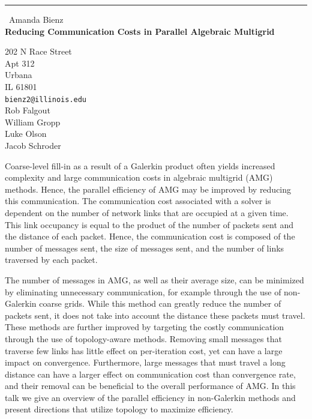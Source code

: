 \documentclass{report}
\begin{document}
\begin{center}
\rule{6in}{1pt} \
{\large Amanda Bienz \\
{\bf Reducing Communication Costs in Parallel Algebraic Multigrid}}

202 N Race Street \\ Apt 312 \\ Urbana \\ IL 61801
\\
{\tt bienz2@illinois.edu}\\
Rob Falgout\\
William Gropp\\
Luke Olson\\
Jacob Schroder\end{center}

Coarse-level fill-in as a result of a Galerkin product often yields
increased complexity and large communication costs in algebraic multigrid
(AMG) methods. Hence, the parallel efficiency of AMG may be improved by
reducing this communication. The communication cost associated with a
solver is dependent on the number of network links that are occupied at a
given time. This link occupancy is equal to the product of the number of
packets sent and the distance of each packet. Hence, the communication
cost is composed of the number of messages sent, the size of messages
sent, and the number of links traversed by each packet.

The number of messages in AMG, as well as their average size, can be
minimized by eliminating unnecessary communication, for example through
the use of non-Galerkin coarse grids. While this method can greatly
reduce the number of packets sent, it does not take into account the
distance these packets must travel. These methods are further improved by
targeting the costly communication through the use of topology-aware
methods. Removing small messages that traverse few links has little
effect on per-iteration cost, yet can have a large impact on convergence.
Furthermore, large messages that must travel a long distance can have a
larger effect on communication cost than convergence rate,
and their removal can be beneficial to the overall performance of AMG. In
this talk we give an overview of the parallel efficiency in non-Galerkin
methods and present directions that utilize topology to maximize
efficiency.
\end{document}
